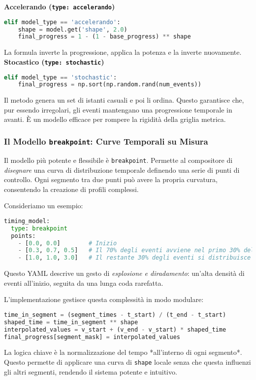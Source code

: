 \textbf{Accelerando (\texttt{type: accelerando})}
\begin{lstlisting}[language=Python]
elif model_type == 'accelerando':
    shape = model.get('shape', 2.0)
    final_progress = 1 - (1 - base_progress) ** shape
\end{lstlisting}
La formula inverte la progressione, applica la potenza e la inverte nuovamente.
\textbf{Stocastico (\texttt{type: stochastic})}

\begin{lstlisting}[language=Python]
elif model_type == 'stochastic':
    final_progress = np.sort(np.random.rand(num_events))
\end{lstlisting}
Il metodo genera un set di istanti casuali e poi li ordina. Questo garantisce che, pur essendo irregolari, gli eventi mantengano una progressione temporale in avanti. È un modello efficace per rompere la rigidità della griglia metrica.
\subsubsection{Il Modello \texttt{breakpoint}: Curve Temporali su Misura}
Il modello più potente e flessibile è \texttt{breakpoint}. Permette al compositore di \textit{disegnare} una curva di distribuzione temporale definendo una serie di punti di controllo. Ogni segmento tra due punti può avere la propria curvatura, consentendo la creazione di profili complessi.

Consideriamo un esempio:
\begin{lstlisting}[language=Python]
timing_model:
  type: breakpoint
  points:
    - [0.0, 0.0]        # Inizio
    - [0.3, 0.7, 0.5]   # Il 70% degli eventi avviene nel primo 30% del tempo (curva concava, ease-out)
    - [1.0, 1.0, 3.0]   # Il restante 30% degli eventi si distribuisce nel 70% del tempo rimanente (curva convessa, ease-in)
\end{lstlisting}
Questo YAML descrive un gesto di \textit{esplosione e diradamento}: un'alta densità di eventi all'inizio, seguita da una lunga coda rarefatta.

L'implementazione gestisce questa complessità in modo modulare:
\begin{lstlisting}[language=Python]
time_in_segment = (segment_times - t_start) / (t_end - t_start)
shaped_time = time_in_segment ** shape
interpolated_values = v_start + (v_end - v_start) * shaped_time
final_progress[segment_mask] = interpolated_values
\end{lstlisting}
La logica chiave è la normalizzazione del tempo *all'interno di ogni segmento*. Questo permette di applicare una curva di \texttt{shape} locale senza che questa influenzi gli altri segmenti, rendendo il sistema potente e intuitivo.